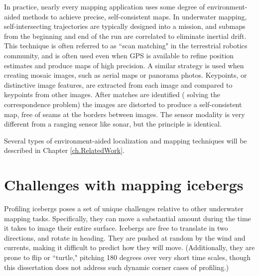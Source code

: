 In practice, nearly every mapping application uses some degree of environment-aided methods to achieve precise, self-consistent maps. In underwater mapping, self-intersecting trajectories are typically designed into a mission, and submaps from the beginning and end of the run are correlated to eliminate inertial drift. This technique is often referred to as ``scan matching" in the terrestrial robotics community, and is often used even when GPS is available to refine position estimates and produce maps of high precision. A similar strategy is used when creating mosaic images, such as aerial maps or panorama photos.  Keypoints, or distinctive image features, are extracted from each image and compared to keypoints from other images. After matches are identified ( solving the correspondence problem) the images are distorted to produce a self-consistent map, free of seams at the borders between images. The sensor modality is very different from a ranging sensor like sonar, but the principle is identical. 

Several types of environment-aided localization and mapping techniques will be described in Chapter \ref{ch.RelatedWork}.

\section{Challenges with mapping icebergs}

Profiling icebergs poses a set of unique challenges relative to other underwater mapping tasks. Specifically, they can move a substantial amount during the time it takes to image their entire surface. Icebergs are free to translate in two directions, and rotate in heading. They are pushed at random by the wind  and currents, making it difficult to predict how they will move. (Additionally, they are prone to flip or ``turtle," pitching 180 degrees over very short time scales, though this dissertation does not address such dynamic corner cases of profiling.) 

